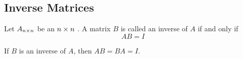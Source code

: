 \subsection{Inverse Matrices}\label{subsec:Inverse_Matrices}
\begin{definition}\label{def:Inverse_Matrix}
  Let $A_{n \times n}$ be an $n \times n$ .
  A matrix $B$ is called an inverse of $A$ if and only if
  \begin{equation}\label{eq:Inverse_Matrix}
    AB = I
  \end{equation}
\end{definition}

\begin{theorem}\label{thm:Inverse_Matrix_Commutativity}
  If $B$ is an inverse of $A$, then $AB = BA = I$.
\end{theorem}



